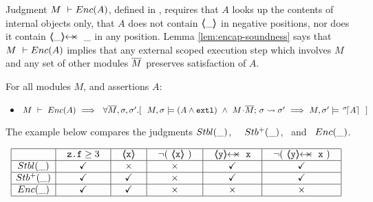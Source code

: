 Judgment $M\ \vdash {\ensuremath Enc( A )}$,  
{defined in} %
,  
{requires that} $A$ looks up the contents of
internal objects only,  
{that $A$} does not contain  $\langle\!\!\langle \_ \rangle\!\!\rangle$  in negative positions,  
{nor does it} contain  $\protectedFrom {\_} {\_}$  
{in any position}.  
Lemma \ref{lem:encap-soundness} says that %
$M\ \vdash {\ensuremath Enc( A )}$  
{implies}
that any external scoped execution step which involves $M$ and any set of other modules $\overline{M}$  %
{preserves} satisfaction of $A$. %


\begin{lemma}[Encapsulation] %
\label{d:encaps}  For all modules $M$, and assertions $A$:  
\label{lem:encap-soundness}

\begin{itemize}
\item
$ \proves{M}{\encaps{A}}   \ \Longrightarrow\ \ \forall \Mtwo, \sigma, \sigma'.[   \ \  \satisfiesA{M}{\sigma}{(A  \wedge \externalexec)}\  \wedge\ { \leadstoBounded {M\madd\Mtwo}  {\sigma}{\sigma'}} %
        \  \Longrightarrow\  
    {M},{\sigma'}\models {\as \sigma A} \ \  ]$
 \end{itemize}
  
 \end{lemma}
 
 The example below compares the judgments ${Stbl( \_ )}$, \ \ ${Stb^+( \_ )}$, \ and \ ${Enc( \_ )}$. %


 $
 \begin{array}{c}
 \begin{array}{|c|c|c|c|c|c|}
 \hline
          & \ \ \prg{z.f}\geq 3  \ \ &  \ \   \inside{\prg{x}} \ \ & \ \ \neg(\ \inside{\prg{x}}\ ) \ \ & \ \ \protectedFrom {\prg{y}} {\prg{x}} \ \ &  \ \ \neg (\ \protectedFrom {\prg{y}} {\prg{x}}\ ) \ \ \\
   \hline
 \Stable  {\_}  &  \checkmark &  \times & \times &  \checkmark  &  \checkmark  \\
 \hline 
  \Pos {\_ } &  \checkmark &   \checkmark  & \times &  \checkmark  &  \checkmark  \\ 
  \hline 
  \encaps{\_ } &   \checkmark &  \checkmark & \times &   \times   &  \times \\ 
  \hline
 \end{array}
  \end{array}
 $




